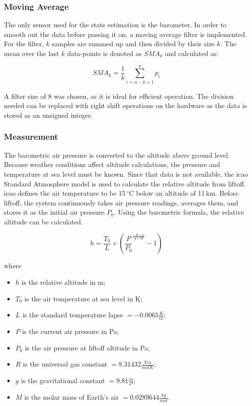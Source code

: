 \subsubsection{Moving Average}
The only sensor used for the state estimation is the barometer. In order to smooth out the data before passing it on, a moving average filter is implemented. For the filter, $k$ samples are summed up and then divided by their size $k$. The mean over the last $k$ data-points is denoted as $SMA_{k}$ and calculated as:

\begin{equation}
    SMA_{k} = \frac{1}{k}\sum _{i=n-k+1}^{n}p_{i}
\end{equation}

A filter size of 8 was chosen, as it is ideal for efficient operation. The division needed can be replaced with right shift operations on the hardware as the data is stored as an unsigned integer.

\subsubsection{Measurement}
The barometric air pressure is converted to the altitude above ground level. Because weather conditions affect altitude calculations, the pressure and temperature at sea level must be known. Since that data is not available, the \acrshort{icao} Standard Atmosphere model is used to calculate the relative altitude from liftoff. \acrshort{icao} defines the air temperature to be 15\,$^{\circ}$C below an altitude of 11\,km. Before liftoff, the system continuously takes air pressure readings, averages them, and stores it as the initial air pressure $P_0$. Using the barometric formula, the relative altitude can be calculated.\cite{atmosphere}

\begin{equation}
    h = \frac{T_0}{L}\times{}\left({\frac{P}{P_0}}^{\frac{-R\times L}{g\times M}} - 1\right)
\end{equation}

where
\begin{itemize}
    \item $h$ is the relative altitude in m;
    \item $T_0$ is the air temperature at sea level in K;
    \item $L$ is the standard temperature lapse $= -0.0065\frac{K}{m}$;
    \item $P$ is the current air pressure in Pa;
    \item $P_0$ is the air pressure at liftoff altitude in Pa;
    \item $R$ is the universal gas constant $= 8.31432 \frac{Nm}{molK}$;
    \item $g$ is the gravitational constant $= 9.81 \frac{m}{s^2}$;
    \item $M$ is the molar mass of Earth's air $= 0.0289644 \frac{kg}{mol}$.
\end{itemize}

